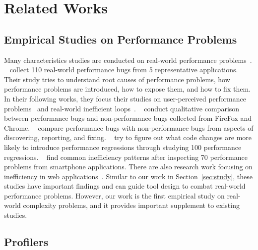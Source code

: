 \newpage

\section{Related Works}
\label{sec:related}

\subsection{Empirical Studies on Performance Problems}

Many characteristics studies are conducted on real-world performance 
problems~\cite{PerfBug,SongOOPSLA2014,ldoctor,Zaman2012MSR,Nistor2013MSR,HuangRegression,SmartphoneStudy,junwen-1, junwen-2}. 
~\citet{PerfBug} collect 110 real-world performance bugs from 5 representative applications.
Their study tries to understand root causes of performance problems,
how performance problems are introduced, how to expose them, and how to fix them.
In their following works, they focus their studies on 
user-perceived performance problems~\cite{SongOOPSLA2014} 
and real-world inefficient loops~\cite{ldoctor}. 
~\citet{Zaman2012MSR} conduct qualitative comparison between performance bugs 
and non-performance bugs collected from FireFox and Chrome. 
~\citet{Nistor2013MSR} compare performance bugs with non-performance bugs 
from aspects of discovering, reporting, and fixing. 
~\citet{HuangRegression} try to figure out what code changes are more likely to introduce performance regressions through 
studying 100 performance regressions. 
~\citet{SmartphoneStudy} find common inefficiency patterns after 
inspecting 70 performance problems from smartphone applications. 
There are also research work focusing on inefficiency in web applications~\cite{junwen-1, junwen-2}. 
Similar to our work in Section~\ref{sec:study}, 
these studies have important findings and can guide tool design to combat 
real-world performance problems. 
However, our work is the first empirical study on real-world complexity problems, 
and it provides important supplement to existing studies. 

\subsection{Profilers}



